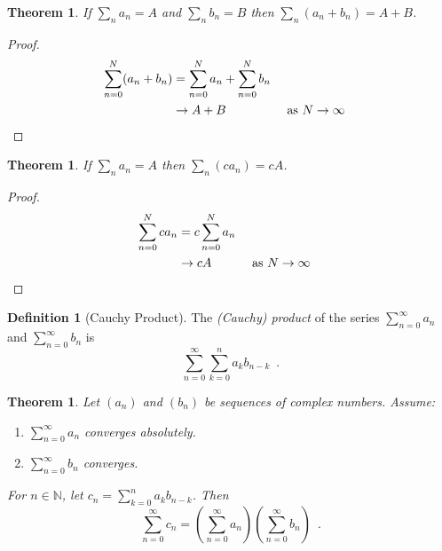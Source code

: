 \documentclass{book}
\let\qed\relax
\newtheorem{thm}[prop]{Theorem}
\theoremstyle{definition}
\newtheorem{df}[prop]{Definition}
\begin{document}
\begin{thm}
If $\sum_n a_n = A$ and $\sum_n b_n = B$ then $\sum_n (a_n + b_n) = A + B$.
\end{thm}

\begin{proof}
\pf
\begin{align*}
\sum_{n=0}^N (a_n + b_n) & = \sum_{n=0}^N a_n + \sum_{n=0}^N b_n \\
& \rightarrow A + B & \text{ as } N \rightarrow \infty & \qed
\end{align*}
\end{proof}

\begin{thm}
If $\sum_n a_n = A$ then $\sum_n (c a_n) = cA$.
\end{thm}

\begin{proof}
\pf
\begin{align*}
\sum_{n=0}^N c a_n & = c \sum_{n=0}^N a_n \\
& \rightarrow cA & \text{ as } N \rightarrow \infty & \qed
\end{align*}
\end{proof}

\begin{df}[Cauchy Product]
The \emph{(Cauchy) product} of the series $\sum_{n=0}^\infty a_n$ and $\sum_{n=0}^\infty b_n$ is
\[ \sum_{n=0}^\infty \sum_{k=0}^n a_k b_{n-k} \enspace . \]
\end{df}

\begin{thm}
\label{thm:Cauchy_product_converges}
Let $(a_n)$ and $(b_n)$ be sequences of complex numbers. Assume:
\begin{enumerate}
\item $\sum_{n=0}^\infty a_n$ converges absolutely.
\item $\sum_{n=0}^\infty b_n$ converges.
\end{enumerate}
For $n \in \mathbb{N}$, let $c_n = \sum_{k=0}^n a_k b_{n-k}$. Then
\[ \sum_{n=0}^\infty c_n = \left( \sum_{n=0}^\infty a_n \right) \left( \sum_{n=0}^\infty b_n \right) \enspace . \]
\end{thm}
\end{document}
